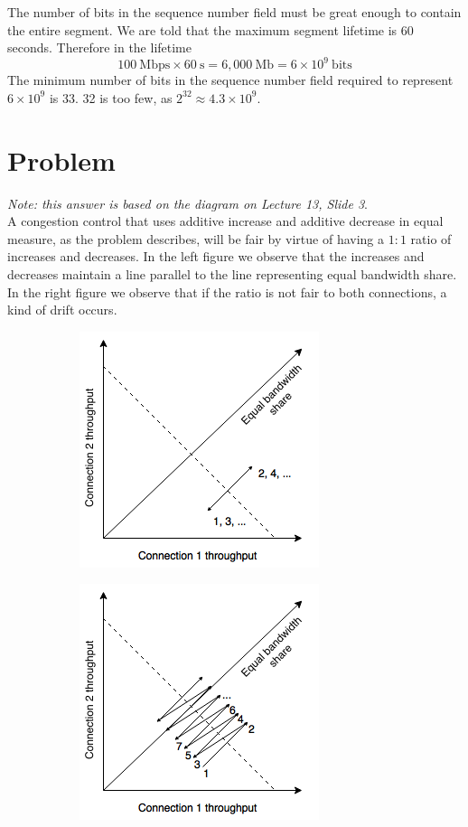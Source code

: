 \documentclass[letterpaper]{article}
\newcommand{\problem}{\section{Problem}}
\begin{document}
The number of bits in the sequence number field must be great enough to
contain the entire segment. We are told that the maximum segment lifetime
is 60 seconds. Therefore in the lifetime
\begin{equation*}
100\ \mathrm{Mbps} \times 60\ \mathrm{s} = 6,000\ \mathrm{Mb} = 6 \times 10^9
\ \mathrm{bits}
\end{equation*}
The minimum number of bits in the sequence number field required to represent
$6 \times 10^9$ is 33. 32 is too few, as \mbox{$2^{32} \approx 4.3 \times 10^9$}.

\problem{}
\textit{Note: this answer is based on the diagram on Lecture 13, Slide 3}.\\
A congestion control that uses additive increase and additive decrease in
equal measure, as the problem describes, will be fair by virtue of having
a $1:1$ ratio of increases and decreases. In the left figure we observe
that the increases and decreases maintain a line parallel to the line
representing equal bandwidth share. In the right figure we observe that
if the ratio is not fair to both connections, a kind of drift occurs.
\begin{figure}
\begin{subfigure}{.5\textwidth}
\includegraphics[scale=0.75]{diagram1}
\end{subfigure}
\begin{subfigure}{.5\textwidth}
\includegraphics[scale=0.75]{diagram2}
\end{subfigure}
\end{figure}
\end{document}
